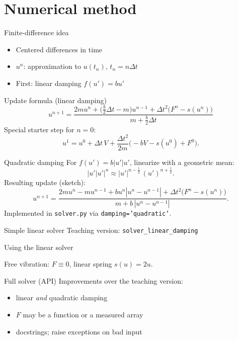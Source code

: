 \section{Numerical method}

\begin{frame}{Finite-difference idea}
  \begin{itemize}
    \item Centered differences in time
    \item $u^n$: approximation to $u(t_n)$, $t_n = n\Delta t$
    \item First: linear damping $f(u') = b u'$
  \end{itemize}
\end{frame}

\begin{frame}{Update formula (linear damping)}
  \[
  u^{n+1} =
  \frac{
    2m u^n + \bigl(\tfrac{b}{2}\Delta t - m\bigr) u^{n-1}
    + \Delta t^2\bigl(F^n - s(u^n)\bigr)
  }{
    m + \tfrac{b}{2}\Delta t
  }
  \]
  Special starter step for $n=0$:
  \[
  u^1 = u^0 + \Delta t\, V
  + \frac{\Delta t^2}{2m}\bigl(-b V - s(u^0) + F^0\bigr).
  \]
\end{frame}

\begin{frame}{Quadratic damping}
  For $f(u') = b|u'|u'$, linearize with a geometric mean:
  \[
  |u'|u'\Big|^{n}
  \approx |u'|^{n-\frac12}\,(u')^{n+\frac12}.
  \]
  Resulting update (sketch):
  \[
  u^{n+1}
  = \frac{
    2m u^n - m u^{n-1}
    + b u^n |u^n - u^{n-1}|
    + \Delta t^2\bigl(F^n - s(u^n)\bigr)
  }{
    m + b\,|u^n - u^{n-1}|
  }.
  \]
  Implemented in \texttt{solver.py} via
  \texttt{damping='quadratic'}.
\end{frame}

\begin{frame}[fragile]{Simple linear solver}
  Teaching version: \texttt{solver\_linear\_damping}
  
\end{frame}

\begin{frame}[fragile]{Using the linear solver}
  
  Free vibration: $F\equiv 0$, linear spring $s(u)=2u$.
\end{frame}

\begin{frame}[fragile]{Full solver (API)}
  Improvements over the teaching version:
  \begin{itemize}
    \item linear \emph{and} quadratic damping
    \item $F$ may be a function or a measured array
    \item docstrings; raise exceptions on bad input
  \end{itemize}
\end{frame}

